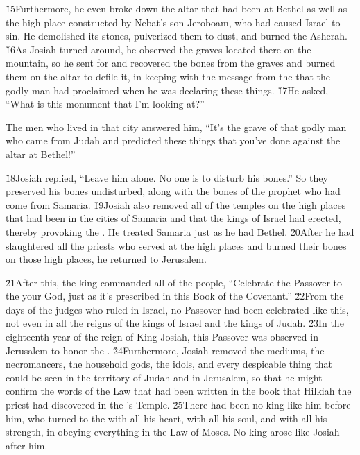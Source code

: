 \v{15}Furthermore, he even broke down the altar that had been at Bethel as well as the high place constructed by Nebat's son Jeroboam, who had caused Israel to sin. He demolished its stones, pulverized them to dust, and burned the Asherah. \v{16}As Josiah turned around, he observed the graves located there on the mountain, so he sent for and recovered the bones from the graves and burned them on the altar to defile it, in keeping with the message from the  that the godly man had proclaimed when he was declaring these things. \v{17}He asked, ``What is this monument that I'm looking at?''

The men who lived in that city answered him, ``It's the grave of that godly man who came from Judah and predicted these things that you've done against the altar at Bethel!''

\v{18}Josiah replied, ``Leave him alone. No one is to disturb his bones.'' So they preserved his bones undisturbed, along with the bones of the prophet who had come from Samaria. \v{19}Josiah also removed all of the temples on the high places that had been in the cities of Samaria and that the kings of Israel had erected, thereby provoking the . He treated Samaria just as he had Bethel. \v{20}After he had slaughtered all the priests who served at the high places and burned their bones on those high places, he returned to Jerusalem.

\v{21}After this, the king commanded all of the people, ``Celebrate the Passover to the  your God, just as it's prescribed in this Book of the Covenant.'' \v{22}From the days of the judges who ruled in Israel, no Passover had been celebrated like this, not even in all the reigns of the kings of Israel and the kings of Judah. \v{23}In the eighteenth year of the reign of King Josiah, this Passover was observed in Jerusalem to honor the . \v{24}Furthermore, Josiah removed the mediums, the necromancers, the household gods, the idols, and every despicable thing that could be seen in the territory of Judah and in Jerusalem, so that he might confirm the words of the Law that had been written in the book that Hilkiah the priest had discovered in the 's Temple. \v{25}There had been no king like him before him, who turned to the  with all his heart, with all his soul, and with all his strength, in obeying everything in the Law of Moses. No king arose like Josiah after him.


